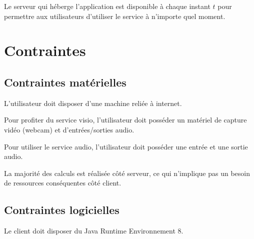 \documentclass[11pt,dvipsnames,svgnames]{report}
\begin{document}
Le serveur qui héberge l'application est disponible à chaque instant $t$ pour permettre aux utilisateurs d'utiliser le service à n'importe quel moment.

\chapter{Contraintes}
\section{Contraintes matérielles}
L'utilisateur doit disposer d'une machine reliée à internet.

Pour profiter du service visio, l'utilisateur doit posséder un matériel de capture vidéo (webcam) et d'entrées/sorties audio.

Pour utiliser le service audio, l'utilisateur doit posséder une entrée et une sortie audio.

La majorité des calculs est réalisée côté serveur, ce qui n'implique pas un besoin de ressources conséquentes côté client.

\section{Contraintes logicielles}

Le client doit disposer du Java Runtime Environnement 8.
\end{document}
